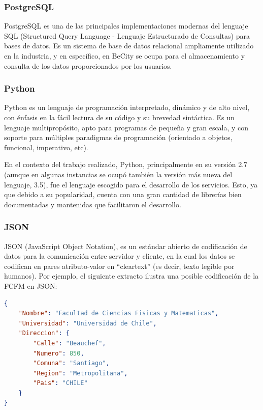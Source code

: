 \documentclass[11pt,letterpaper]{article}
\begin{document}

\subsubsection{PostgreSQL}

PostgreSQL\cite{postgres} es una de las principales implementaciones modernas del lenguaje SQL (Structured Query Language - Lenguaje Estructurado de Consultas) para bases de datos. Es un sistema de base de datos relacional ampliamente utilizado en la industria, y en específico, en BeCity se ocupa para el almacenamiento y consulta de los datos proporcionados por los usuarios.

\subsubsection{Python}

Python es un lenguaje de programación interpretado, dinámico y de alto nivel, con énfasis en la fácil lectura de su código y su brevedad sintáctica. Es un lenguaje multipropósito, apto para programas de pequeña y gran escala, y con soporte para múltiples paradigmas de programación (orientado a objetos, funcional, imperativo, etc).

En el contexto del trabajo realizado, Python, principalmente en su versión 2.7 (aunque en algunas instancias se ocupó también la versión más nueva del lenguaje, 3.5), fue el lenguaje escogido para el desarrollo de los servicios. Esto, ya que debido a su popularidad, cuenta con una gran cantidad de librerías bien documentadas y mantenidas que facilitaron el desarrollo. %

\subsubsection{JSON}

JSON (JavaScript Object Notation), es un estándar abierto de codificación de datos para la comunicación entre servidor y cliente, en la cual los datos se codifican en pares atributo-valor en ``cleartext'' (es decir, texto legible por humanos).
Por ejemplo, el siguiente extracto ilustra una posible codificación de la FCFM en JSON:
\begin{lstlisting}[language=JSON]
{
    "Nombre": "Facultad de Ciencias Fisicas y Matematicas",
    "Universidad": "Universidad de Chile",
    "Direccion": {
        "Calle": "Beauchef",
        "Numero": 850,
        "Comuna": "Santiago",
        "Region": "Metropolitana",
        "Pais": "CHILE"
    }
}
\end{lstlisting}
\end{document}
